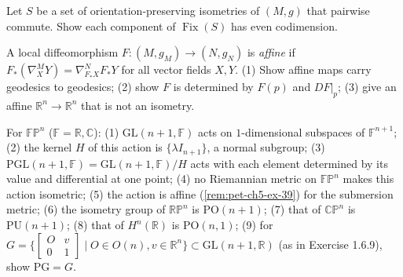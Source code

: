 \begin{remark}
  \label{rem:pet-ch5-ex-38}
  Let $S$ be a set of orientation-preserving isometries of $(M,g)$ that pairwise
  commute. Show each component of $\operatorname{Fix}(S)$ has even codimension.
\end{remark}

\begin{remark}
  \label{rem:pet-ch5-ex-39}
  A local diffeomorphism $F:(M,g_M)\to(N,g_N)$ is \emph{affine} if
  $F_*(\nabla^M_XY)=\nabla^N_{F_*X}F_*Y$ for all vector fields $X,Y$. (1) Show
  affine maps carry geodesics to geodesics; (2) show $F$ is determined by $F(p)$
  and $DF|_p$; (3) give an affine $\mathbb R^n\to\mathbb R^n$ that is not an
  isometry.
\end{remark}

\begin{remark}
  \label{rem:pet-ch5-ex-40}
  For $\mathbb{FP}^n$ ($\mathbb F=\mathbb R,\mathbb C$): (1) $\mathrm{GL}(n{+}1,
  \mathbb F)$ acts on $1$-dimensional subspaces of $\mathbb F^{n+1}$; (2) the
  kernel $H$ of this action is $\{\lambda I_{n+1}\}$, a normal subgroup; (3)
  $\mathrm{PGL}(n{+}1,\mathbb F)=\mathrm{GL}(n{+}1,\mathbb F)/H$ acts with each
  element determined by its value and differential at one point; (4) no
  Riemannian metric on $\mathbb{FP}^n$ makes this action isometric; (5) the action
  is affine (\cref{rem:pet-ch5-ex-39}) for the submersion metric; (6) the isometry
  group of $\mathbb{RP}^n$ is $\mathrm{PO}(n{+}1)$; (7) that of $\mathbb{CP}^n$ is
  $\mathrm{PU}(n{+}1)$; (8) that of $H^n(\mathbb R)$ is $\mathrm{PO}(n,1)$; (9) for
  $G=\{[\begin{smallmatrix}O&v\\0&1\end{smallmatrix}]\mid O\in O(n),v\in\mathbb R^n\}
  \subset\mathrm{GL}(n{+}1,\mathbb R)$ (as in Exercise 1.6.9), show $\mathrm{PG}=G$.
\end{remark}


